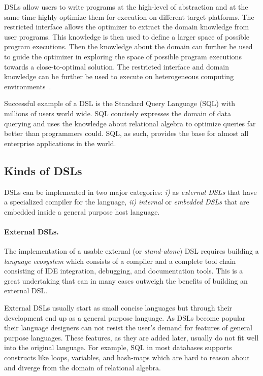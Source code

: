 DSLs allow users to write programs at the high-level of abstraction and at the
 same time highly optimize them for execution on different target platforms. The restricted interface allows the optimizer to extract the domain knowledge from user programs. This knowledge is then used to define a larger space of possible program executions. Then the knowledge about the domain can further be used to guide the optimizer in exploring the space of possible program executions towards a close-to-optimal solution. The restricted interface and domain knowledge can be further be used to execute on heterogeneous computing environments~\cite{rompf_optimizing_2013}.

Successful example of a DSL is the Standard Query Language (SQL) with millions of users world wide.
 SQL concisely expresses the domain of data querying and uses the knowledge about relational  algebra
 to optimize queries far better than programmers could. SQL, as such, provides the base for almost all enterprise applications in the world.

\subsection{Kinds of DSLs}
\label{sec:kinds-of-dsls}

DSLs can be implemented in two major categories: \emph{i)} as \emph{external DSLs} that
 have a specialized compiler for the language, \emph{ii)} \emph{internal} or \emph{embedded DSLs} that are embedded inside a general purpose host language.

\paragraph{External DSLs.} The implementation of a usable external (or \emph{stand-alone}) DSL requires building a \emph{language ecosystem} which consists of a compiler and a complete
tool chain consisting of IDE integration, debugging, and documentation
tools. This is a great undertaking that can in many cases outweigh the
benefits of building an external DSL. %

External DSLs usually start as small concise languages but through their development end up as a general purpose language. As DSLs become popular their  language designers can not resist the user's demand for features of general purpose languages. These features, as they are added later, usually do not fit well into the original language. For example, SQL in most databases supports constructs like loops, variables, and hash-maps which are hard to reason about and diverge from the domain of relational algebra.

